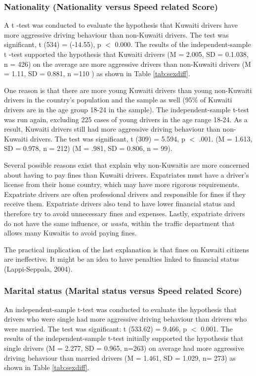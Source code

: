 \documentclass[preprint,12pt,a4paper,authoryear]{elsarticle}
\begin{document}
\begin{linenumbers}
\subsubsection{Nationality (Nationality versus Speed related Score)}

A t -test was conducted to evaluate the hypothesis that Kuwaiti drivers have more aggressive driving behaviour than non-Kuwaiti drivers. The test was significant, t (534) = (-14.55), p $<$ 0.000. The results of the independent-sample t -test supported the hypothesis that Kuwaiti drivers (M = 2.005, SD = 0.1.038, n = 426) on the average are more aggressive drivers than non-Kuwaiti drivers (M = 1.11, SD = 0.881, n =110 ) as shown in Table \ref{tab:sexdiff}. 


One reason is that there are more young Kuwaiti drivers than young non-Kuwaiti drivers in the country's population and the sample as well (95\% of Kuwaiti drivers are in the age group 18-24 in the sample). The independent-sample t-test was run again, excluding 225 cases of young drivers in the age range 18-24. As a result, Kuwaiti drivers still had more aggressive driving behaviour than non-Kuwaiti drivers. The test was significant, t (309) = 5.594, p $<$ .001. (M = 1.613, SD = 0.978, n = 212) (M = .981, SD = 0.806,  n = 99). 

Several possible reasons exist that explain why non-Kuwaitis are more concerned about having to pay fines than Kuwaiti drivers. Expatriates must have a driver's license from their home country, which may have more rigorous requirements. Expatriate drivers are often professional drivers and responsible for fines if they receive them. Expatriate drivers also tend to have lower financial status and therefore try to avoid unnecessary fines and expenses. Lastly, expatriate drivers do not have the same influence, or \textit{ wasta}, within the traffic department that allows many Kuwaitis to avoid paying fines.

The practical implication of the last explanation is that fines on Kuwaiti citizens are ineffective. It might be an idea to have penalties linked to financial status (Lappi-Seppala, 2004). 

\subsubsection{Marital status (Marital status versus Speed related Score)}

An independent-sample t-test was conducted to evaluate the hypothesis that drivers who were single had more aggressive driving behaviour than drivers who were married. The test was significant: t (533.62) = 9.466, p $<$ 0.001. The results of the independent-sample t-test initially supported the hypothesis that single drivers (M = 2.277, SD = 0.965, n=263) on average had more aggressive driving behaviour than married drivers (M = 1.461, SD = 1.029, n= 273) as shown in Table \ref{tab:sexdiff}.


\end{linenumbers}
\end{document}

